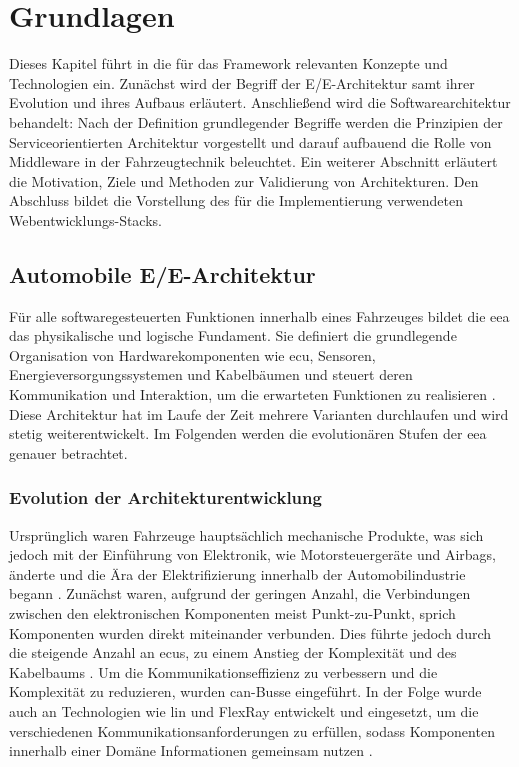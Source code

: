 \chapter{Grundlagen}
\label{sect:basics}

Dieses Kapitel führt in die für das Framework relevanten Konzepte und Technologien ein. Zunächst wird der Begriff der E/E-Architektur samt ihrer Evolution und ihres Aufbaus erläutert. Anschließend wird die Softwarearchitektur behandelt: Nach der Definition grundlegender Begriffe werden die Prinzipien der Serviceorientierten Architektur vorgestellt und darauf aufbauend die Rolle von Middleware in der Fahrzeugtechnik beleuchtet. Ein weiterer Abschnitt erläutert die Motivation, Ziele und Methoden zur Validierung von Architekturen. Den Abschluss bildet die Vorstellung des für die Implementierung verwendeten Webentwicklungs-Stacks.


\section{Automobile E/E-Architektur}
\label{sect:eearchitecture}

Für alle softwaregesteuerten Funktionen innerhalb eines Fahrzeuges bildet die \gls{eea} das physikalische und logische Fundament. Sie definiert die grundlegende Organisation von Hardwarekomponenten wie \gls{ecu}, Sensoren, Energieversorgungssystemen und Kabelbäumen und steuert deren Kommunikation und Interaktion, um die erwarteten Funktionen zu realisieren \cite{jiang2019vehicle}. Diese Architektur hat im Laufe der Zeit mehrere Varianten durchlaufen und wird stetig weiterentwickelt. Im Folgenden werden die evolutionären Stufen der \gls{eea} genauer betrachtet.

\subsection*{Evolution der Architekturentwicklung}

Ursprünglich waren Fahrzeuge hauptsächlich mechanische Produkte, was sich jedoch mit der Einführung von Elektronik, wie Motorsteuergeräte und Airbags, änderte und die Ära der Elektrifizierung innerhalb der Automobilindustrie begann \cite{jiang2019vehicle}\cite{zhuRequirementsDrivenAutomotiveElectrical2021}. Zunächst waren, aufgrund der geringen Anzahl, die Verbindungen zwischen den elektronischen Komponenten meist Punkt-zu-Punkt, sprich Komponenten wurden direkt miteinander verbunden. Dies führte jedoch durch die steigende Anzahl an \glspl{ecu}, zu einem Anstieg der Komplexität und des Kabelbaums \cite{wang2024review}. Um die Kommunikationseffizienz zu verbessern und die Komplexität zu reduzieren, wurden \gls{can}-Busse eingeführt. In der Folge wurde auch an Technologien wie \gls{lin} und FlexRay entwickelt und eingesetzt, um die verschiedenen Kommunikationsanforderungen zu erfüllen, sodass Komponenten innerhalb einer Domäne Informationen gemeinsam nutzen \cite{wang2024review}\cite{zhuRequirementsDrivenAutomotiveElectrical2021}.

